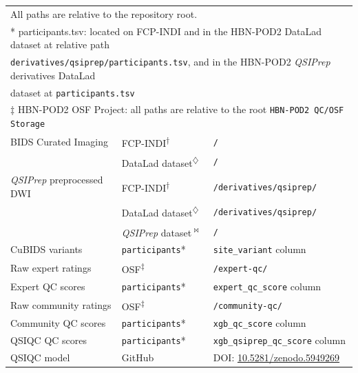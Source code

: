 \documentclass[fleqn,10pt,inline]{wlscirep}
\begin{document}
\begin{longtable}{p{4.0cm}p{2.9cm}p{9.3cm}}
\multicolumn{3}{l}{{\hspace{2em}All paths are relative to the repository root.}} \\
\multicolumn{3}{l}{{* participants.tsv: located on FCP-INDI and in the HBN-POD2 DataLad dataset at relative path}} \\
\multicolumn{3}{l}{{\hspace{2em}\texttt{derivatives/qsiprep/participants.tsv}, and in the HBN-POD2 \emph{QSIPrep} derivatives DataLad}} \\
\multicolumn{3}{l}{{\hspace{2em}dataset at \texttt{participants.tsv}}} \\
\multicolumn{3}{l}{{$\ddagger$ HBN-POD2 OSF Project\cite{hbn-pod2-osf}: all paths are relative to the root \texttt{HBN-POD2 QC/OSF Storage}}} \\
\bottomrule
\endlastfoot
    BIDS Curated Imaging
        & FCP-INDI\textsuperscript{$\dagger$}
        & \texttt{/} \\
        & DataLad dataset\textsuperscript{$\diamondsuit$}
        & \texttt{/} \\
    \hline
    \emph{QSIPrep} preprocessed DWI
        & FCP-INDI\textsuperscript{$\dagger$}
        & \texttt{/derivatives/qsiprep/} \\
        & DataLad dataset\textsuperscript{$\diamondsuit$}
        & \texttt{/derivatives/qsiprep/} \\
        & \emph{QSIPrep} dataset\textsuperscript{$\Join$}
        & \texttt{/} \\
    \hline
    CuBIDS variants
        & \texttt{participants}*
        & \texttt{site\_variant} column  \\
    \hline
    Raw expert ratings
        & OSF\textsuperscript{$\ddagger$}
        & \texttt{/expert-qc/} \\
    \hline
    Expert QC scores
        & \texttt{participants}*
        & \texttt{expert\_qc\_score} column \\
    \hline
    Raw community ratings
        & OSF\textsuperscript{$\ddagger$}
        & \texttt{/community-qc/} \\
    \hline
    Community QC scores
        & \texttt{participants}*
        & \texttt{xgb\_qc\_score} column \\
    \hline
    QSIQC QC scores
        & \texttt{participants}*
        & \texttt{xgb\_qsiprep\_qc\_score} column \\
    \hline
    QSIQC model
        & GitHub
        & DOI: \href{https://doi.org/10.5281/zenodo.5949269}{10.5281/zenodo.5949269} \\

\end{longtable}
\end{document}
